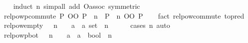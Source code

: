\begin{isabellebody}
%
\isadelimproof
\ \ %
\endisadelimproof
%
\isatagproof
{}\isamarkupfalse%
\ {\isacharparenleft}{\kern0pt}induct\ n{\isacharparenright}{\kern0pt}\ {\isacharparenleft}{\kern0pt}simp{\isacharunderscore}{\kern0pt}all\ add{\isacharcolon}{\kern0pt}\ O{\isacharunderscore}{\kern0pt}assoc\ {\isacharbrackleft}{\kern0pt}symmetric{\isacharbrackright}{\kern0pt}{\isacharparenright}{\kern0pt}%
\endisatagproof
{\isafoldproof}%
%
\isadelimproof
\isanewline
%
\endisadelimproof
\isanewline
{}\isamarkupfalse%
\ relpowp{\isacharunderscore}{\kern0pt}commute{\isacharcolon}{\kern0pt}\ {\isachardoublequoteopen}P\ OO\ P\ {\isacharcircum}{\kern0pt}{\isacharcircum}{\kern0pt}\ n\ {\isacharequal}{\kern0pt}\ P\ {\isacharcircum}{\kern0pt}{\isacharcircum}{\kern0pt}\ n\ OO\ P{\isachardoublequoteclose}\isanewline
%
\isadelimproof
\ \ %
\endisadelimproof
%
\isatagproof
{}\isamarkupfalse%
\ {\isacharparenleft}{\kern0pt}fact\ relpow{\isacharunderscore}{\kern0pt}commute\ {\isacharbrackleft}{\kern0pt}to{\isacharunderscore}{\kern0pt}pred{\isacharbrackright}{\kern0pt}{\isacharparenright}{\kern0pt}%
\endisatagproof
{\isafoldproof}%
%
\isadelimproof
\isanewline
%
\endisadelimproof
\isanewline
{}\isamarkupfalse%
\ relpow{\isacharunderscore}{\kern0pt}empty{\isacharcolon}{\kern0pt}\ {\isachardoublequoteopen}{}\ {\isacharless}{\kern0pt}\ n\ {\isasymLongrightarrow}\ {\isacharparenleft}{\kern0pt}{\isacharbraceleft}{\kern0pt}{\isacharbraceright}{\kern0pt}\ {\isacharcolon}{\kern0pt}{\isacharcolon}{\kern0pt}\ {\isacharparenleft}{\kern0pt}{\isacharprime}{\kern0pt}a\ {\isasymtimes}\ {\isacharprime}{\kern0pt}a{\isacharparenright}{\kern0pt}\ set{\isacharparenright}{\kern0pt}\ {\isacharcircum}{\kern0pt}{\isacharcircum}{\kern0pt}\ n\ {\isacharequal}{\kern0pt}\ {\isacharbraceleft}{\kern0pt}{\isacharbraceright}{\kern0pt}{\isachardoublequoteclose}\isanewline
%
\isadelimproof
\ \ %
\endisadelimproof
%
\isatagproof
{}\isamarkupfalse%
\ {\isacharparenleft}{\kern0pt}cases\ n{\isacharparenright}{\kern0pt}\ auto%
\endisatagproof
{\isafoldproof}%
%
\isadelimproof
\isanewline
%
\endisadelimproof
\isanewline
{}\isamarkupfalse%
\ relpowp{\isacharunderscore}{\kern0pt}bot{\isacharcolon}{\kern0pt}\ {\isachardoublequoteopen}{}\ {\isacharless}{\kern0pt}\ n\ {\isasymLongrightarrow}\ {\isacharparenleft}{\kern0pt}{\isasymbottom}\ {\isacharcolon}{\kern0pt}{\isacharcolon}{\kern0pt}\ {\isacharprime}{\kern0pt}a\ {\isasymRightarrow}\ {\isacharprime}{\kern0pt}a\ {\isasymRightarrow}\ bool{\isacharparenright}{\kern0pt}\ {\isacharcircum}{\kern0pt}{\isacharcircum}{\kern0pt}\ n\ {\isacharequal}{\kern0pt}\ {\isasymbottom}{\isachardoublequoteclose}\isanewline

\end{isabellebody}
